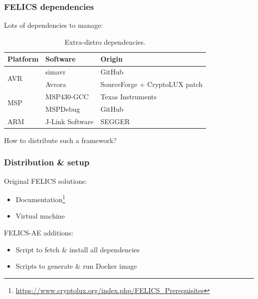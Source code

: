 \documentclass[english]{beamer}
\begin{document}
\begin{frame}
  \frametitle{FELICS dependencies}

  Lots of dependencies to manage:

  \begin{table}[H]
    \centering
    \begin{tabular}{l|l|l}
      \textbf{Platform} & \textbf{Software} & \textbf{Origin}               \\
      \hline
      \multirow{2}{*}{AVR}
                        & simavr            & GitHub                        \\
                        & Avrora            & SourceForge + CryptoLUX patch \\
      \hline
      \multirow{2}{*}{MSP}
                        & MSP430-GCC        & Texas Instruments             \\
                        & MSPDebug          & GitHub                        \\
      \hline
      \multirow{1}{*}{ARM}
                        & J-Link Software   & SEGGER                        \\
      \hline
    \end{tabular}
    \caption{Extra-distro dependencies.}
    \label{table:dependencies}
  \end{table}

  How to distribute such a framework?

\end{frame}

\begin{frame}
  \frametitle{Distribution \& setup}

  Original FELICS solutions:

  \begin{itemize}
  \item Documentation\footnote{\url{https://www.cryptolux.org/index.php/FELICS_Prerequisites}}
  \item Virtual machine
  \end{itemize}

  \pause

  FELICS-AE additions:

  \begin{itemize}
  \item Script to fetch \& install all dependencies
  \item Scripts to generate \& run Docker image
  \end{itemize}

\end{frame}
\end{document}
